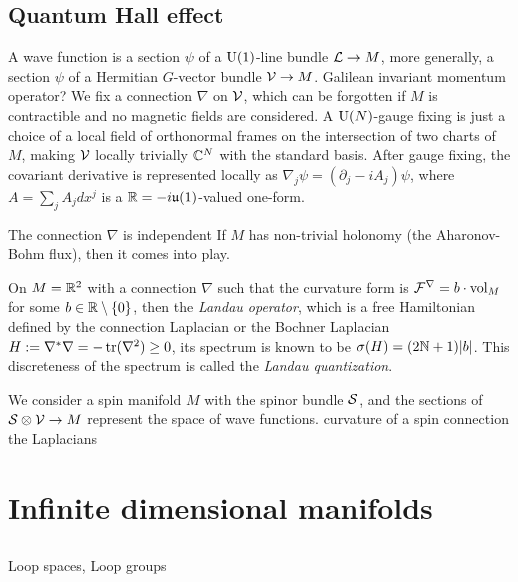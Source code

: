 \documentclass{../../large}
\begin{document}
\section{Quantum Hall effect}
A wave function is a section $\psi$ of a $\mathrm{U}(1)$-line bundle $\mathcal{L}\to M$, more generally, a section $\psi$ of a Hermitian $G$-vector bundle $\mathcal{V}\to M$.
Galilean invariant momentum operator?
We fix a connection $\nabla$ on $\mathcal{V}$, which can be forgotten if $M$ is contractible and no magnetic fields are considered.
A $\mathrm{U}(N)$-gauge fixing is just a choice of a local field of orthonormal frames on the intersection of two charts of $M$, making $\mathcal{V}$ locally trivially $\mathbb{C}^N$ with the standard basis.
After gauge fixing, the covariant derivative is represented locally as $\nabla_j\psi=(\partial_j-iA_j)\psi$, where $A=\sum_jA_jdx^j$ is a $\mathbb{R}=-i\mathfrak{u}(1)$-valued one-form.

The connection $\nabla$ is independent
If $M$ has non-trivial holonomy (the Aharonov-Bohm flux), then it comes into play.


On $M=\mathbb{R}^2$ with a connection $\nabla$ such that the curvature form is $\mathcal{F}^\nabla=b\cdot\operatorname{vol}_M$ for some $b\in\mathbb{R}\setminus\{0\}$, then the \emph{Landau operator}, which is a free Hamiltonian defined by the connection Laplacian or the Bochner Laplacian $H:=\nabla^*\nabla=-\operatorname{tr}(\nabla^2)\ge0$, its spectrum is known to be $\sigma(H)=(2\mathbb{N}+1)|b|$.
This discreteness of the spectrum is called the \emph{Landau quantization}.


We consider a spin manifold $M$ with the spinor bundle $\mathcal{S}$, and the sections of $\mathcal{S}\otimes\mathcal{V}\to M$ represent the space of wave functions.
curvature of a spin connection
the Laplacians





\chapter{Infinite dimensional manifolds}
\section{}

Loop spaces,
Loop groups
\end{document}
